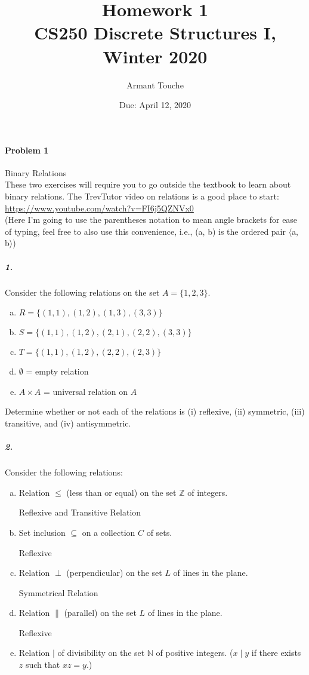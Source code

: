 \documentclass[11pt, a4paper]{article}
\title{\bf Homework 1\\[1ex]
\rm\normalsize CS250 Discrete Structures I, Winter 2020 }
\date{\normalsize Due: April 12, 2020}
\author{\normalsize Armant Touche}
\newcommand{\stuple}[1]{$\langle$#1$\rangle$} %
\begin{document}
 
\vspace{0cm}\maketitle 
	\paragraph{Problem 1} Binary Relations\\

	These two exercises will require you to go outside the textbook to learn about binary relations. The TrevTutor video on relations is a good place to start: \url{https://www.youtube.com/watch?v=FI6j5QZNVx0}\\

	(Here I'm going to use the parentheses notation to mean angle brackets for ease of typing, feel free to also use this convenience, i.e., (a, b) is the ordered pair \stuple{a, b})
		\subparagraph{1.} Consider the following relations on the set $A = \{1, 2, 3\}$.

        \begin{enumerate}[(a)]
			\item $R = \{(1, 1), (1, 2), (1, 3), (3, 3)\}$
                
			\item $S = \{(1, 1), (1, 2), (2, 1), (2, 2), (3, 3)\}$
			\item $T = \{(1, 1), (1, 2), (2, 2), (2, 3)\}$
			\item $\emptyset$ = empty relation
			\item $A \times A$ = universal relation on $A$
        \end{enumerate}

		Determine whether or not each of the relations is (i) reflexive, (ii) symmetric, (iii) transitive, and (iv) antisymmetric.

		\subparagraph{2.} Consider the following relations:
        \begin{enumerate}[(a)]
			\item Relation $\leq$ (less than or equal) on the set $\mathbb{Z}$ of integers.

                Reflexive and Transitive Relation

			\item Set inclusion $\subseteq$ on a collection $C$ of sets.

                Reflexive

			\item Relation $\perp$ (perpendicular) on the set $L$ of lines in the plane.

                Symmetrical Relation

			\item Relation $\parallel$ (parallel) on the set $L$ of lines in the plane.


               Reflexive 

			\item Relation $\mid$ of divisibility on the set $\mathbb{N}$ of positive integers. ($x \mid y$ if there exists $z$ such that $xz = y$.)
        \end{enumerate}
\end{document}
